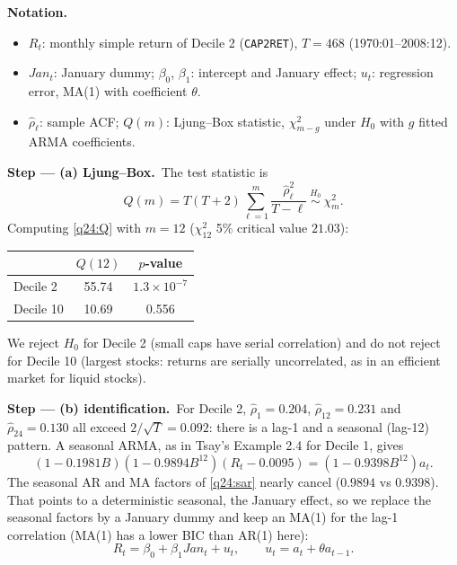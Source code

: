 \documentclass[11pt,a4paper]{article}
\newenvironment{notacao}{\par\smallskip\noindent\textbf{Notation.}\begin{itemize}[leftmargin=1.4em,topsep=1pt,itemsep=0pt]\small}{\end{itemize}}
\newcommand{\passo}[2]{\par\smallskip\noindent\textbf{Step --- #1.}~#2}
\begin{document}
\begin{sol}
\begin{notacao}
\item $R_t$: monthly simple return of Decile 2 (\texttt{CAP2RET}), $T=468$ (1970:01--2008:12).
\item $Jan_t$: January dummy; $\beta_0$, $\beta_1$: intercept and January effect; $u_t$: regression error, MA(1) with coefficient $\theta$.
\item $\hat\rho_\ell$: sample ACF; $Q(m)$: Ljung--Box statistic, $\chi^2_{m-g}$ under $H_0$ with $g$ fitted ARMA coefficients.
\end{notacao}

\passo{(a) Ljung--Box}{The test statistic is}
\begin{equation}\label{q24:Q} Q(m)=T(T+2)\sum_{\ell=1}^{m}\frac{\hat\rho_\ell^2}{T-\ell}\ \overset{H_0}{\sim}\ \chi^2_m . \end{equation}
Computing \eqref{q24:Q} with $m=12$ ($\chi^2_{12}$ 5\% critical value $21.03$):
\begin{center}\small
\begin{tabular}{lcc}
\toprule
 & $Q(12)$ & $p$-value\\
\midrule
Decile 2 & 55.74 & $1.3\times10^{-7}$\\
Decile 10 & 10.69 & 0.556\\
\bottomrule
\end{tabular}
\end{center}
We reject $H_0$ for Decile 2 (small caps have serial correlation) and do not reject for Decile 10 (largest
stocks: returns are serially uncorrelated, as in an efficient market for liquid stocks).

\passo{(b) identification}{For Decile 2, $\hat\rho_1=0.204$, $\hat\rho_{12}=0.231$ and $\hat\rho_{24}=0.130$
all exceed $2/\sqrt{T}=0.092$: there is a lag-1 and a seasonal (lag-12) pattern. A seasonal ARMA, as in Tsay's
Example 2.4 for Decile 1, gives}
\begin{equation}\label{q24:sar} (1-0.1981B)(1-0.9894B^{12})(R_t-0.0095)=(1-0.9398B^{12})a_t . \end{equation}
The seasonal AR and MA factors of \eqref{q24:sar} nearly cancel ($0.9894$ vs $0.9398$). That points to a
deterministic seasonal, the January effect, so we replace the seasonal factors by a January dummy and keep
an MA(1) for the lag-1 correlation (MA(1) has a lower BIC than AR(1) here):
\begin{equation}\label{q24:reg} R_t=\beta_0+\beta_1 Jan_t+u_t,\qquad u_t=a_t+\theta a_{t-1}. \end{equation}


\end{sol}
\end{document}
